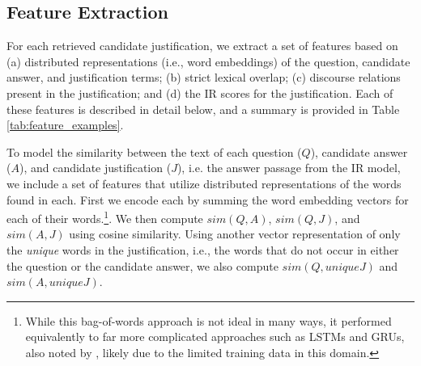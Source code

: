 \subsection{Feature Extraction}
\label{sec-emnlp2017:features}
For each retrieved candidate justification, we extract a set of features based on (a) distributed representations (i.e., word embeddings) of the question, candidate answer, and justification terms; (b) strict lexical overlap; (c) discourse relations present in the justification; and (d) the IR scores for the justification.  Each of these features is described in detail below, and a summary is provided in Table \ref{tab:feature_examples}.

{ } To model the similarity between the text of each question ($Q$), candidate answer ($A$), and candidate justification ($J$), i.e. the answer passage from the IR model, we include a set of features that utilize distributed representations of the words found in each.
First we encode each 
by summing the word embedding vectors for each of their words.\footnote{While this bag-of-words approach is not ideal in many ways, it performed equivalently to far more complicated approaches such as LSTMs and GRUs, also noted by \citep{Iyyer2015}, likely due to the limited training data in this domain.}.  We then compute $sim(Q, A)$, $sim(Q, J)$, and $sim(A, J)$ using cosine similarity.  Using another vector representation of only the \emph{unique} words in the justification, i.e., the words that do not occur in either the question or the candidate answer, we also compute $sim(Q, uniqueJ)$ and $sim(A, uniqueJ)$.  

